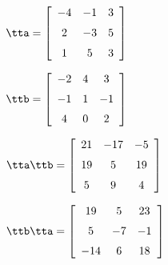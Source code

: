 {$\tta = \left[ \begin {array}{ccc} -4&-1&3\\\noalign{\medskip}2&-3&5
\\\noalign{\medskip}1&5&3\end {array} \right]$ 

$\ttb =  \left[ \begin {array}{ccc} -2&4&3\\\noalign{\medskip}-1&1&-1
\\\noalign{\medskip}4&0&2\end {array} \right]$}
{$\tta\ttb = \left[ \begin {array}{ccc} 21&-17&-5\\\noalign{\medskip}19&5&19
\\\noalign{\medskip}5&9&4\end {array} \right]$

$\ttb\tta = \left[ \begin {array}{ccc} 19&5&23\\\noalign{\medskip}5&-7&-1
\\\noalign{\medskip}-14&6&18\end {array} \right]$ }

 

  

  

 

